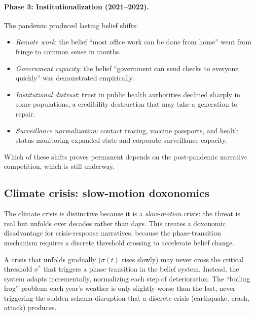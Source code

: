 \begin{example}
\paragraph{Phase 3: Institutionalization (2021--2022).}
The pandemic produced lasting belief shifts:
\begin{itemize}[nosep]
  \item \emph{Remote work}: the belief ``most office work can be done from home'' went from fringe to common sense in months.
  \item \emph{Government capacity}: the belief ``government can send checks to everyone quickly'' was demonstrated empirically.
  \item \emph{Institutional distrust}: trust in public health authorities declined sharply in some populations, a credibility destruction that may take a generation to repair.
  \item \emph{Surveillance normalization}: contact tracing, vaccine passports, and health status monitoring expanded state and corporate surveillance capacity.
\end{itemize}
Which of these shifts proves permanent depends on the post-pandemic narrative competition, which is still underway.
\end{example}

\subsection{Climate crisis: slow-motion doxonomics}

The climate crisis is distinctive because it is a \emph{slow-motion} crisis: the threat is real but unfolds over decades rather than days.
This creates a doxonomic disadvantage for crisis-response narratives, because the phase-transition mechanism requires a discrete threshold crossing to accelerate belief change.

\begin{proposition}
\label{prop:slow-crisis}
A crisis that unfolds gradually ($\sigma(t)$ rises slowly) may never cross the critical threshold $\sigma^*$ that triggers a phase transition in the belief system.
Instead, the system adapts incrementally, normalizing each step of deterioration.
The ``boiling frog'' problem: each year's weather is only slightly worse than the last, never triggering the sudden schema disruption that a discrete crisis (earthquake, crash, attack) produces.
\end{proposition}


